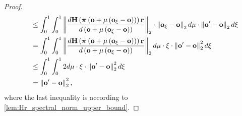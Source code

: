 \begin{proof}
\begin{equation*}
\begin{split}
    &\quad \le \int_0^1{  \int_0^1{ \left\| \frac{d {\mathbf{H}} \left( {\boldsymbol{\pi}}\left( {\mathbf{o}} + \mu\left( {\mathbf{o}}_{\xi} - {\mathbf{o}} \right) \right) \right) {\mathbf{r}} }{d \left( {\mathbf{o}} + \mu\left( {\mathbf{o}}_{\xi} - {\mathbf{o}} \right) \right)} \right\|_2 \cdot \left\| {\mathbf{o}}_{\xi} - {\mathbf{o}} \right\|_2 d\mu} \cdot \left\| {\mathbf{o}}^\prime - {\mathbf{o}} \right\|_2 d\xi} \\
    &\quad = \int_0^1{  \int_0^1{ \left\| \frac{d {\mathbf{H}} \left( {\boldsymbol{\pi}}\left( {\mathbf{o}} + \mu\left( {\mathbf{o}}_{\xi} - {\mathbf{o}} \right) \right) \right) {\mathbf{r}} }{d \left( {\mathbf{o}} + \mu\left( {\mathbf{o}}_{\xi} - {\mathbf{o}} \right) \right)} \right\|_2 d\mu} \cdot \xi \cdot \left\| {\mathbf{o}}^\prime - {\mathbf{o}} \right\|_2^2 d\xi} \\
    &\quad \le \int_0^1{  \int_0^1{ 2 d\mu} \cdot \xi \cdot \left\| {\mathbf{o}}^\prime - {\mathbf{o}} \right\|_2^2 d\xi} \\
    &\quad = \left\| {\mathbf{o}}^\prime - {\mathbf{o}} \right\|_2^2,
\end{split}
\end{equation*}
where the last inequality is according to \cref{lem:Hr_spectral_norm_upper_bound}.
\end{proof}

